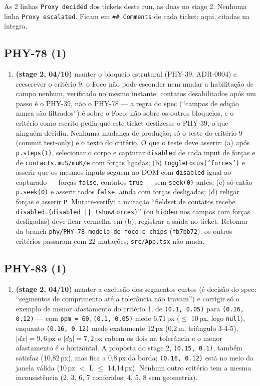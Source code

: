 \documentclass[11pt,a4paper]{article}
\begin{document}
As 2 linhas \texttt{Proxy decided} dos tickets deste run, as duas no stage 2.
Nenhuma linha \texttt{Proxy escalated}. Ficam em \texttt{\#\# Comments} de cada
ticket; aqui, citadas na íntegra.

{\small\sloppy
\subsection*{PHY-78 (1)}
\begin{enumerate}
  \item \textbf{(stage 2, 04/10)} manter o bloqueio estrutural (PHY-39,
  ADR-0004) e reescrever o critério 9: o Foco não pode esconder nem mudar a
  habilitação de campo nenhum, verificado no mesmo instante; contatos
  desabilitados após um passo é o PHY-39, não o PHY-78 --- a regra do spec
  (``campos de edição nunca são filtrados'') é sobre o Foco, não sobre os outros
  bloqueios, e o critério como escrito pedia que este ticket desfizesse o
  PHY-39, o que ninguém decidiu. Nenhuma mudança de produção; só o teste do
  critério 9 (commit test-only) e o texto do critério. O que o teste deve
  asserir: (a) após \texttt{p.steps(1)}, selecionar o corpo e capturar
  \texttt{disabled} de cada input de forças e de
  \texttt{contacts.muS/muK/e} com forças ligadas; (b)
  \texttt{toggleFocus('forces')} e asserir que os mesmos inputs seguem no DOM
  com \texttt{disabled} igual ao capturado --- forças \texttt{false}, contatos
  \texttt{true} --- sem \texttt{seek(0)} antes; (c) só então
  \texttt{p.seek(0)} e asserir todos \texttt{false}, ainda com forças
  desligadas; (d) religar forças e asserir \texttt{P}. Mutate-verify: a
  mutação ``fieldset de contatos recebe \texttt{disabled=\{disabled ||
  !showForces\}}'' (ou \texttt{hidden} nos campos com forças desligadas) deve
  ficar vermelha em (b); registrar a saída no ticket. Retomar da branch
  \texttt{phy/PHY-78-modelo-de-foco-e-chips} (\texttt{fb7bb72}): os outros
  critérios passaram com 22 mutações; \texttt{src/App.tsx} não muda.
\end{enumerate}
\subsection*{PHY-83 (1)}
\begin{enumerate}
  \item \textbf{(stage 2, 04/10)} manter a exclusão dos segmentos curtos (é
  decisão do spec: ``segmentos de comprimento até a tolerância não travam'') e
  corrigir só o exemplo de menor afastamento do critério 1, de
  \texttt{(0.1, 0.05)} para \texttt{(0.16, 0.12)} --- com \texttt{ppm = 60},
  \texttt{(0.1, 0.05)} mede 6,71\,px ($\leq$ 10\,px, logo \texttt{null}),
  enquanto \texttt{(0.16, 0.12)} mede exatamente 12\,px (0,2\,m, triângulo
  3-4-5), $|dx| = 9{,}6$\,px e $|dy| = 7{,}2$\,px cabem os dois na tolerância e
  o menor afastamento é o horizontal. A proposta do stage 2,
  \texttt{(0.15, 0.1)}, também satisfaz (10,82\,px), mas fica a 0,8\,px da
  borda; \texttt{(0.16, 0.12)} está no meio da janela válida
  (10\,px $<$ L $\leq$ 14,14\,px). Nenhum outro critério tem a mesma
  inconsistência (2, 3, 6, 7 conferidos; 4, 5, 8 sem geometria).
\end{enumerate}
}
\end{document}
